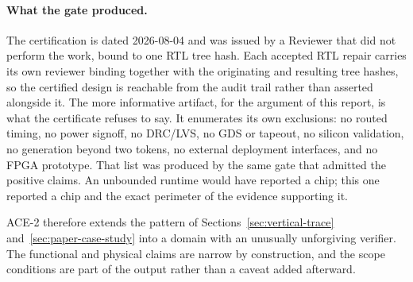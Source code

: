 \paragraph{What the gate produced.} The certification is dated 2026-08-04 and was
issued by a Reviewer that did not perform the work, bound to one RTL tree hash.
Each accepted RTL repair carries its own reviewer binding together with the
originating and resulting tree hashes, so the certified design is reachable from
the audit trail rather than asserted alongside it. The more informative artifact,
for the argument of this report, is what the certificate refuses to say. It
enumerates its own exclusions: no routed timing, no power signoff, no DRC/LVS, no
GDS or tapeout, no silicon validation, no generation beyond two tokens, no
external deployment interfaces, and no FPGA prototype. That list was produced by
the same gate that admitted the positive claims. An unbounded runtime would have
reported a chip; this one reported a chip and the exact perimeter of the evidence
supporting it.

ACE-2 therefore extends the pattern of Sections~\ref{sec:vertical-trace}
and~\ref{sec:paper-case-study} into a domain with an unusually unforgiving
verifier. The functional and physical claims are narrow by construction, and the
scope conditions are part of the output rather than a caveat added afterward.
